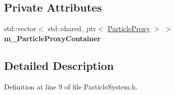 \subsection*{Private Attributes}
\begin{DoxyCompactItemize}
\item 
std\+::vector$<$ std\+::shared\+\_\+ptr$<$ \hyperlink{class_particle_proxy}{Particle\+Proxy} $>$ $>$ {\bfseries m\+\_\+\+Particle\+Proxy\+Container}\hypertarget{class_particle_system_ac06fcd838245587146b91c349e4d7500}{}\label{class_particle_system_ac06fcd838245587146b91c349e4d7500}

\end{DoxyCompactItemize}


\subsection{Detailed Description}


Definition at line 9 of file Particle\+System.\+h.

